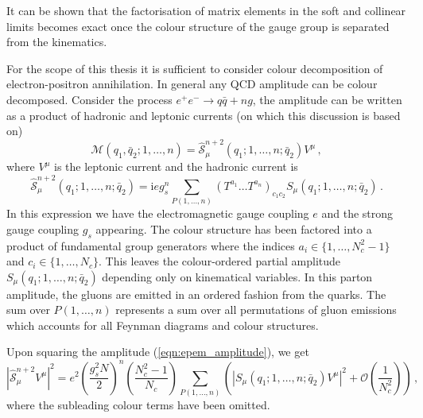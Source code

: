 \documentclass[main.tex]{subfiles}
\begin{document}
    It can be shown that the factorisation of matrix
    elements in the soft and collinear limits becomes
    exact once the colour structure of the gauge group
    is separated from the kinematics. 

    For the scope of this thesis it is sufficient
    to consider colour decomposition of electron-positron
    annihilation. In general any QCD amplitude can be
    colour decomposed. Consider the process $e^{+}e^{-} \rightarrow q\bar{q} + n g$,
    the amplitude can be written as a product of hadronic and
    leptonic currents \cite{Campbell:1998nn} (on which this discussion is based on)
    \begin{equation}\label{eqn:epem_amplitude}
        \mathcal{M}(q_{1}, \bar{q}_{2}; 1, \ldots, n) = \hat{\mathcal{S}}_{\mu}^{n+2}(q_{1}; 1,\ldots,n; \bar{q}_{2})V^{\mu} \, ,
    \end{equation}
    where $V^{\mu}$ is the leptonic current and the hadronic
    current is
    \begin{equation}\label{eqn:hadronic_current}
        \hat{\mathcal{S}}_{\mu}^{n+2}(q_{1};1,\ldots,n;\bar{q}_{2}) = \mathrm{i}eg_{s}^{n} \sum_{P(1,\ldots,n)}(T^{a_{1}} \ldots T^{a_{n}})_{c_{1}c_{2}}S_{\mu}(q_{1};1,\ldots,n;\bar{q}_{2}) \, .
    \end{equation}
    In this expression we have the electromagnetic gauge coupling
    $e$ and the strong gauge coupling $g_{s}$ appearing. The colour
    structure has been factored into a product of fundamental group
    generators where the indices $a_{i} \in \{1,\ldots, N_{c}^{2}-1\}$
    and $c_{i} \in \{1,\ldots,N_{c}\}$. This leaves the colour-ordered
    partial amplitude $S_{\mu}(q_{1};1,\ldots,n;\bar{q}_{2})$ depending
    only on kinematical variables. In this parton amplitude, the gluons
    are emitted in an ordered fashion from the quarks.
    The sum over $P(1,\ldots,n)$ represents a sum over all permutations
    of gluon emissions which accounts for all Feynman diagrams and colour structures.

    Upon squaring the amplitude (\ref{eqn:epem_amplitude}), we get
    \begin{equation}\label{eqn:epem_me2}
        \left|\hat{\mathcal{S}}_{\mu}^{n+2}V^{\mu}\right|^{2} = e^{2}\left(\dfrac{g_{s}^{2}N}{2}\right)^{n}\left(\dfrac{N_{c}^{2}-1}{N_{c}}\right) \sum_{P(1,\ldots,n)} \left(\left|S_{\mu}(q_{1};1,\ldots,n;\bar{q}_{2})V^{\mu}\right|^{2} + \mathcal{O}\left(\dfrac{1}{N_{c}^{2}}\right)\right) \, ,
    \end{equation}
    where the subleading colour terms have been omitted.
\end{document}
